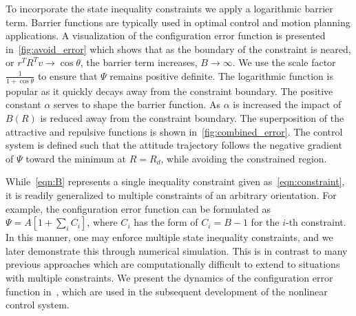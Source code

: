 \documentclass[fleqn]{IJCAS}  %
\begin{document}
\begin{multicols}{2}
To incorporate the state inequality constraints we apply a logarithmic barrier term.
Barrier functions are typically used in optimal control and motion planning applications.
A visualization of the configuration error function is presented in~\cref{fig:avoid_error} which shows that as the boundary of the constraint is neared, or \( r^T R^T v \to \cos \theta \), the barrier term increases, \( B \to \infty\).
We use the scale factor~\(\frac{1}{1+\cos \theta} \) to ensure that \( \Psi \) remains positive definite.
The logarithmic function is popular as it quickly decays away from the constraint boundary.
The positive constant \( \alpha \) serves to shape the barrier function.
As \( \alpha \) is increased the impact of \( B(R) \) is reduced away from the constraint boundary. 
The superposition of the attractive and repulsive functions is shown in~\cref{fig:combined_error}.
The control system is defined such that the attitude trajectory follows the negative gradient of \( \Psi \) toward the minimum at \( R = R_d \), while avoiding the constrained region.

While~\cref{eqn:B} represents a single inequality constraint given as~\cref{eqn:constraint}, it is readily generalized to multiple constraints of an arbitrary orientation. 
For example, the configuration error function can be formulated as $\Psi=A[1+\sum_i C_i]$, where $C_i$ has the form of $C_i=B-1$ for the $i$-th constraint. 
In this manner, one may enforce multiple state inequality constraints, and we later demonstrate this through numerical simulation. 
This is in contrast to many previous approaches which are computationally difficult to extend to situations with multiple constraints.
We present the dynamics of the configuration error function in~, which are used in the subsequent development of the nonlinear control system.


\end{multicols}
\end{document}
